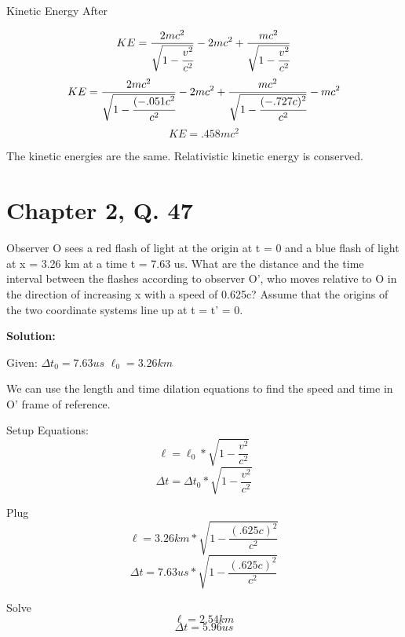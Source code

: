 \documentclass{article}
\begin{document}
Kinetic Energy After

$$ KE = \frac{2mc^2}{\sqrt{1 - \cfrac{v^2}{c^2}}} - 2mc^2 + \frac{mc^2}{\sqrt{1 - \cfrac{v^2}{c^2}}}$$
$$ KE = \frac{2mc^2}{\sqrt{1 - \cfrac{(-.051c^2}{c^2}}} - 2mc^2 + \frac{mc^2}{\sqrt{1 - \cfrac{(-.727c)^2}{c^2}}} - mc^2$$
$$ KE =  .458 mc^2 $$

The kinetic energies are the same. Relativistic kinetic energy is conserved.


\section*{Chapter 2, Q. 47}
Observer O sees a red flash of light at the origin at t = 0 and a blue flash of light at x = 3.26 km at a time t = 7.63 us. What are the distance and the time interval between the flashes according to observer O', who moves relative to O in the direction of increasing x with a speed of 0.625c?  Assume that the origins of the two coordinate systems line up at t = t' = 0.

\textbf{Solution:}

Given:
$ \Delta t_0 = 7.63us $ $ \ell_0= 3.26km $

We can use the length and time dilation equations to find the speed and time in O' frame of reference.

Setup Equations:
	$$\ell = \ell_0 * \sqrt{1 - \frac{v^2}{c^2}}$$
	$$\Delta t = \Delta t_0 * \sqrt{1 - \frac{v^2}{c^2}}$$

Plug
	$$\ell = 3.26 km * \sqrt{1 - \frac{(.625c)^2}{c^2}}$$
	$$\Delta t = 7.63 us * \sqrt{1 - \frac{(.625c)^2}{c^2}}$$

Solve
	$$\ell = 2.54km$$
	$$\Delta t = 5.96 us $$
\end{document}
